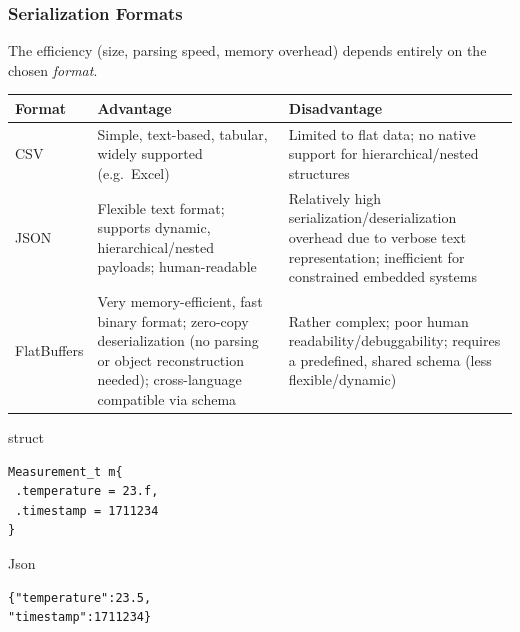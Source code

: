   \subsubsection{Serialization Formats}\label{Serialization_Formats}
  \vspace*{-0.1cm}
    The efficiency (size, parsing speed, memory overhead) depends entirely on the chosen \emph{format}.
  \vspace*{-0.2cm}
    \begin{center}
      \begin{tabular}{lp{3.8cm}p{3.8cm}}
        \toprule
        \textbf{Format} & \textbf{Advantage}                                                                                                                                      & \textbf{Disadvantage}                                                                                                                   \\ \midrule
        CSV             & Simple, text-based, tabular, widely supported  (e.g.\ Excel)                                                                                            & Limited to flat data; no native support for hierarchical/nested structures                                                              \\ \midrule %
        JSON            & Flexible text format; supports dynamic, hierarchical/nested payloads; human-readable                                                                    & Relatively high serialization/deserialization overhead due to verbose text representation; inefficient for constrained embedded systems \\ \midrule
        FlatBuffers     & Very memory-efficient, fast binary format; zero-copy deserialization (no parsing or object reconstruction needed); cross-language compatible via schema & Rather complex; poor human readability/debuggability; requires a predefined, shared schema (less flexible/dynamic)                      \\ \bottomrule
      \end{tabular}
    \end{center}
  \vspace*{-0.2cm}
\begin{minipage}[t]{0.26\columnwidth}
  \CC{} struct
  \vspace*{-0.2cm}
\begin{lstlisting}[morekeywords={[2]Measurement_t}, morekeywords={[4]m, temperature, timestamp}]
Measurement_t m{
 .temperature = 23.f,
 .timestamp = 1711234
}
\end{lstlisting}
\vspace*{-0.2cm}
Json\vspace*{-0.1cm}
\begin{lstlisting}
{"temperature":23.5, 
"timestamp":1711234}
\end{lstlisting}
\end{minipage}
